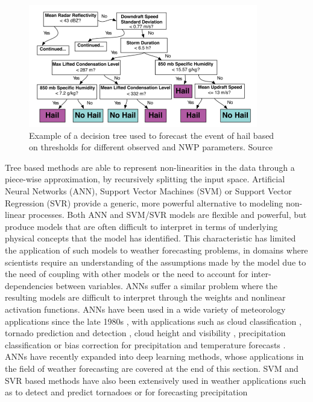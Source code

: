 \medskip

\begin{figure}[h]
 \centerline{\includegraphics[width=10cm]{decision_tree.png}} \caption{Example of a decision tree used to forecast the event of hail based on thresholds for different observed and NWP parameters. Source \citep{mcgovern2017using}}\label{decision_tree}
\end{figure}

Tree based methods are able to represent non-linearities in the data through a piece-wise approximation, by recursively splitting the input space. Artificial Neural Networks (ANN), Support Vector Machines (SVM) or Support Vector Regression (SVR) provide a generic, more powerful alternative to modeling non-linear processes. Both ANN and SVM/SVR models are flexible and powerful, but produce models that are often difficult to interpret in terms of underlying physical concepts that the model has identified. This characteristic has limited the application of such models to weather forecasting problems, in domains where scientists require an understanding of the assumptions made by the model due to the need of coupling with other models or the need to account for inter-dependencies between variables. ANNs suffer a similar problem where the resulting models are difficult to interpret through the weights and nonlinear activation functions. ANNs have been used in a wide variety of meteorology applications since the late 1980s \citep{key1989classification}, with applications such as cloud classification \citep{bankert1994cloud}, tornado prediction and detection \citep{marzban2006mos}, cloud height and visibility \citep{marzban2007ceiling}, precipitation classification \citep{anagnostou2004convective} or bias correction for precipitation and temperature forecasts \citep{moghim2017bias}. ANNs have recently expanded into deep learning methods, whose applications in the field of weather forecasting are covered at the end of this section. SVM and SVR based methods have also been extensively used in weather applications such as to detect and predict tornadoes \citep{adrianto2009support} or for forecasting precipitation \citep{wei2012wavelet,liu2015wavelet} 

